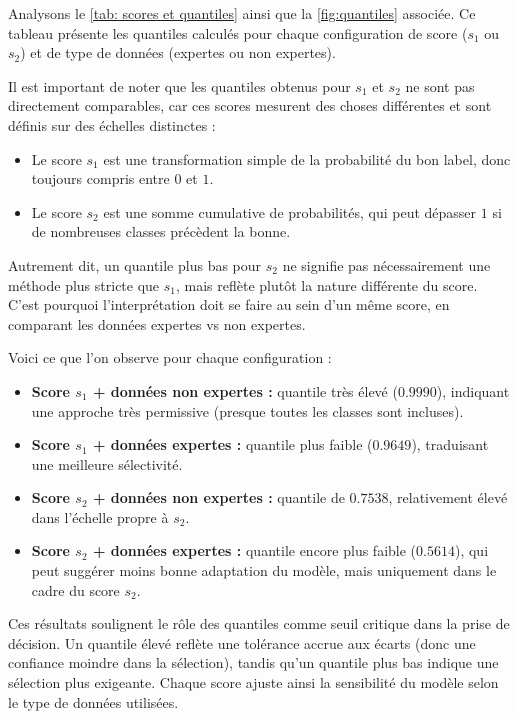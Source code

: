 \documentclass[a4paper,12pt]{article}
\begin{document}
Analysons le \autoref{tab: scores et quantiles} ainsi que la \autoref{fig:quantiles} associée.
Ce tableau présente les quantiles calculés pour chaque configuration de score ($s_1$ ou $s_2$) et de type de données (expertes ou non expertes).

Il est important de noter que les quantiles obtenus pour $s_1$ et $s_2$ ne sont pas directement comparables, car ces scores mesurent des choses différentes et sont définis sur des échelles distinctes :
\begin{itemize}
    \item Le score $s_1$ est une transformation simple de la probabilité du bon label, donc toujours compris entre $0$ et $1$.
    \item Le score $s_2$ est une somme cumulative de probabilités, qui peut dépasser $1$ si de nombreuses classes précèdent la bonne.
\end{itemize}

Autrement dit, un quantile plus bas pour $s_2$ ne signifie pas nécessairement une méthode plus stricte que $s_1$, mais reflète plutôt la nature différente du score. C’est pourquoi l’interprétation doit se faire au sein d’un même score, en comparant les données expertes vs non expertes.

Voici ce que l’on observe pour chaque configuration :
\begin{itemize}
\item \textbf{Score $s_1$ + données non expertes :} quantile très élevé ($0.9990$), indiquant une approche très permissive (presque toutes les classes sont incluses).
\item \textbf{Score $s_1$ + données expertes :} quantile plus faible ($0.9649$), traduisant une meilleure sélectivité.
\item \textbf{Score $s_2$ + données non expertes :} quantile de $0.7538$, relativement élevé dans l’échelle propre à $s_2$.
\item \textbf{Score $s_2$ + données expertes :} quantile encore plus faible ($0.5614$), qui peut suggérer moins bonne adaptation du modèle, mais uniquement dans le cadre du score $s_2$.
\end{itemize}

\vspace{0.2cm}

Ces résultats soulignent le rôle des quantiles comme seuil critique dans la prise de décision. Un quantile élevé reflète une tolérance accrue aux écarts (donc une confiance moindre dans la sélection), tandis qu’un quantile plus bas indique une sélection plus exigeante. Chaque score ajuste ainsi la sensibilité du modèle selon le type de données utilisées.
\end{document}
